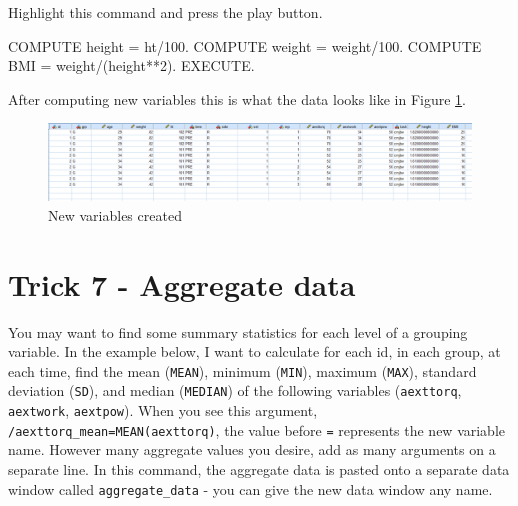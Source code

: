 \documentclass[
]{book}
\newenvironment{Shaded}{\begin{snugshade}}{\end{snugshade}}
\newcommand{\DecValTok}[1]{\textcolor[rgb]{0.00,0.00,0.81}{#1}}
\newcommand{\FloatTok}[1]{\textcolor[rgb]{0.00,0.00,0.81}{#1}}
\newcommand{\NormalTok}[1]{#1}
\newcommand{\OtherTok}[1]{\textcolor[rgb]{0.56,0.35,0.01}{#1}}
\newcommand{\SpecialCharTok}[1]{\textcolor[rgb]{0.00,0.00,0.00}{#1}}
\begin{document}
Highlight this command and press the play button.

\begin{Shaded}
\begin{Highlighting}[]
\NormalTok{COMPUTE height }\OtherTok{=}\NormalTok{ ht}\SpecialCharTok{/}\FloatTok{100.} 
\NormalTok{COMPUTE weight }\OtherTok{=}\NormalTok{ weight}\SpecialCharTok{/}\FloatTok{100.}
\NormalTok{COMPUTE BMI }\OtherTok{=}\NormalTok{ weight}\SpecialCharTok{/}\NormalTok{(height}\SpecialCharTok{**}\DecValTok{2}\NormalTok{).}
\NormalTok{EXECUTE.}
\end{Highlighting}
\end{Shaded}

After computing new variables this is what the data looks like in Figure \ref{fig:mutate}.

\begin{figure}
\includegraphics[width=1\linewidth]{images/mutate} \caption{New variables created}\label{fig:mutate}
\end{figure}

\hypertarget{trick-7---aggregate-data}{%
\chapter*{Trick 7 - Aggregate data}\label{trick-7---aggregate-data}}

You may want to find some summary statistics for each level of a grouping variable. In the example below, I want to calculate for each id, in each group, at each time, find the mean (\texttt{MEAN}), minimum (\texttt{MIN}), maximum (\texttt{MAX}), standard deviation (\texttt{SD}), and median (\texttt{MEDIAN}) of the following variables (\texttt{aexttorq}, \texttt{aextwork}, \texttt{aextpow}). When you see this argument, \texttt{/aexttorq\_mean=MEAN(aexttorq)}, the value before \texttt{=} represents the new variable name. However many aggregate values you desire, add as many arguments on a separate line. In this command, the aggregate data is pasted onto a separate data window called \texttt{aggregate\_data} - you can give the new data window any name.
\end{document}
